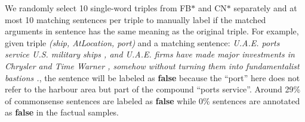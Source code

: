 \documentclass[11pt,a4paper]{article}
\newcommand{\KZ}[1]{\textcolor{blue}{Kenny: #1}}
\newcommand{\RP}[1]{\textcolor{red}{Rephrase: \ul{#1}}}
\begin{document}
	
	

	
	


We randomly select 10 single-word triples from FB$*$ and 
CN$*$ separately and at most 10 matching sentences per triple 
to manually label if the matched arguments in sentence has 
the same meaning as the original triple. For example, given triple \textit{(ship, AtLocation, port)} and a matching sentence: \textit{U.A.E. ports service U.S. military ships , and U.A.E. firms have made major investments in Chrysler and Time Warner , somehow without turning them into fundamentalist bastions .}, the sentence will be labeled as \textbf{false} because the ``port'' 
here does not refer to the harbour area but part of the compound ``ports service''. 
Around 29\% of commonsense sentences are labeled as \textbf{false} while 
0\% sentences are annotated as \textbf{false} in the factual samples. 
\end{document}
